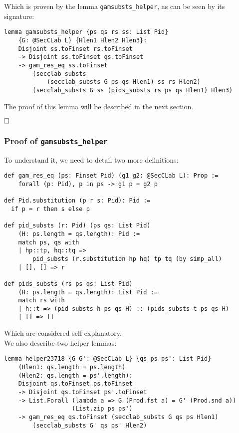 \documentclass[12pt,a4paper,twoside]{book}
\newcommand{\qed}{\hfill\square}
\begin{document}
\begin{itemize}
Which is proven by the lemma \texttt{gamsubsts\_helper}, as can be seen by its signature:
\begin{samepage}
\begin{verbatim}
lemma gamsubsts_helper {ps qs rs ss: List Pid}
    {G: @SecCLab L} {Hlen1 Hlen2 Hlen3}:
    Disjoint ss.toFinset rs.toFinset
    -> Disjoint ss.toFinset qs.toFinset
    -> gam_res_eq ss.toFinset
        (secclab_substs
            (secclab_substs G ps qs Hlen1) ss rs Hlen2)
        (secclab_substs G ss (pids_substs rs ps qs Hlen1) Hlen3)
\end{verbatim}
\end{samepage}
The proof of this lemma will be described in the next section.
\end{itemize}
$\qed$

\subsubsection{Proof of \texttt{gamsubsts\_helper}}
To understand it, we need to detail two more definitions:
\begin{samepage}
\begin{verbatim}
def gam_res_eq (ps: Finset Pid) (g1 g2: @SecCLab L): Prop :=
    forall (p: Pid), p in ps -> g1 p = g2 p

def Pid.substitution (p r s: Pid): Pid :=
  if p = r then s else p

def pid_substs (r: Pid) (ps qs: List Pid)
    (H: ps.length = qs.length): Pid :=
    match ps, qs with
    | hp::tp, hq::tq =>
        pid_substs (r.substitution hp hq) tp tq (by simp_all)
    | [], [] => r

def pids_substs (rs ps qs: List Pid)
    (H: ps.length = qs.length): List Pid :=
    match rs with
    | h::t => (pid_substs h ps qs H) :: (pids_substs t ps qs H)
    | [] => []
\end{verbatim}
\end{samepage}
Which are considered self-explanatory.\\
We also describe two helper lemmas:
\begin{samepage}
\begin{verbatim}
lemma helper23718 {G G': @SecCLab L} {qs ps ps': List Pid}
    (Hlen1: qs.length = ps.length)
    (Hlen2: qs.length = ps'.length):
    Disjoint qs.toFinset ps.toFinset
    -> Disjoint qs.toFinset ps'.toFinset
    -> List.Forall (lambda a => G (Prod.fst a) = G' (Prod.snd a))
                   (List.zip ps ps')
    -> gam_res_eq qs.toFinset (secclab_substs G qs ps Hlen1)
        (secclab_substs G' qs ps' Hlen2)
\end{verbatim}
\end{samepage}
\end{document}
